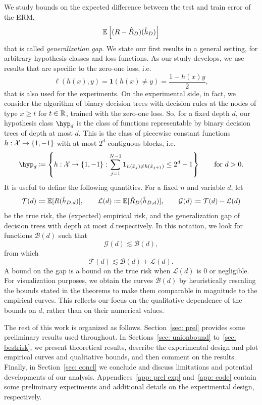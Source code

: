 \documentclass[reqno]{amsart}
\begin{document}
We study bounds on the expected difference between the test and train error of the ERM,
\begin{equation}\label{eq: gen gap}
\mathbb{E}\left[(R - \hat R_D)(\hat h_D)\right]
\end{equation}
that is called {\it generalization gap}. We state our first results in a general setting, for arbitrary hypothesis classes and loss functions. As our study develops, we use results that are specific to the zero-one loss, i.e.\
\begin{equation}\label{eq: counting loss}
    \ell(h(x),y) = \mathbf{1} (h(x)\neq y) = \frac{1 - h(x)y}{2},
\end{equation}
that is also used for the experiments. 
On the experimental side, in fact, we consider the algorithm of binary decision trees with decision rules at the nodes of type $x\ge t$ for $t\in\mathbb{R}$, trained with the zero-one loss. So, for a fixed depth $d$, our hypothesis class $\hyp_d$ is the class of functions representable by binary decision trees of depth at most $d$. This is the class of piecewise constant functions $h:\mathcal{X} \to \{1,-1\}$ with at most $2^d$ contiguous blocks, i.e.
\begin{equation}\label{eq: def trees}
\hyp_d \coloneq \left\{ h:\X \to \{1,-1\} : \sum_{j=1}^{N-1} \mathbf{1}_{h(\bar x_j) \neq h(\bar x_{j+1})} \le 2^{d}-1 \right\} \qquad \text{for } d>0.
\end{equation} 
It is useful to define the following quantities. For a fixed $n$ and variable $d$, let
\[
\mathcal T(d) \coloneq \mathbb{E}[R(\hat h_{D,d})], \qquad \mathcal L(d) \coloneq \mathbb{E}[\hat R_D(\hat h_{D,d})], \qquad \mathcal G(d)\coloneq \mathcal T(d)-\mathcal L(d)
\]
be the true risk, the (expected) empirical risk, and the generalization gap of decision trees with depth at most $d$ respectively. In this notation, we look for functions $\mathcal B(d)$ such that 
\[
\mathcal G(d) \lesssim \mathcal B(d),
\]
from which 
\[
\mathcal T(d) \lesssim \mathcal B(d) + \mathcal L(d).
\]
A bound on the gap is a bound on the true risk when $\mathcal L(d)$ is $0$ or negligible. For visualization purposes, we obtain the curves $\mathcal B(d)$ by heuristically rescaling the bounds stated in the theorems to make them comparable in magnitude to the empirical curves. This reflects our focus on the qualitative dependence of the bounds on $d$, rather than on their numerical values.

The rest of this work is organized as follows. Section~\ref{sec: prel} provides some preliminary results used throughout. In Sections~\ref{sec: unionbound} to~\ref{sec: bestrisk}, we present theoretical results, describe the experimental design and plot empirical curves and qualitative bounds, and then comment on the results. Finally, in Section~\ref{sec: concl} we conclude and discuss limitations and potential developments of our analysis. 
Appendices~\ref{app: prel exp} and~\ref{app: code} contain some preliminary experiments and additional details on the experimental design, respectively.
\end{document}

